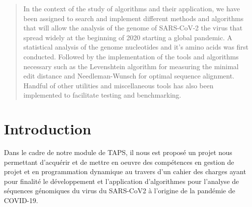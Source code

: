 \documentclass[12pt]{article}
\begin{document}
\renewcommand{\abstractname}{Abstract}

\begin{abstract}
In the context of the study of algorithms and their application, we have been assigned to search and implement different methods and algorithms that will allow the analysis of the genome of SARS-CoV-2 the virus that spread widely at the beginning of 2020 starting a global pandemic. A statistical analysis of the genome nucleotides and it's amino acids was first conducted. Followed by the implementation of the tools and algorithms necessary such as the Levenshtein algorithm for measuring the minimal edit distance and Needleman-Wunsch for optimal sequence alignment. Handful of other utilities and miscellaneous tools has also been implemented to facilitate testing and benchmarking. 
\end{abstract}

\newpage

\tableofcontents

\newpage



\section*{Introduction} 


Dans le cadre de notre module de TAPS, il nous est proposé un projet nous permettant d'acquérir et de mettre en oeuvre des compétences en gestion de projet et en programmation dynamique au travers d'un cahier des charges ayant pour finalité le développement et l'application d'algorithmes pour l'analyse de séquences génomiques du virus du SARS-CoV2 à l'origine de la pandémie de COVID-19.\\
\end{document}

